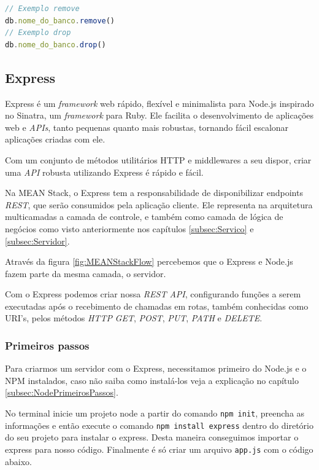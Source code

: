 \documentclass[
	12pt,				%
	openright,			%
	twoside,			%
	a4paper,			%
	english,			%
	brazil				%
	]{abntex2}
\begin{document}
\begin{lstlisting}[language=javascript]
// Exemplo remove
db.nome_do_banco.remove()
// Exemplo drop
db.nome_do_banco.drop()
\end{lstlisting}


\subsection{Express}

Express é um \textit{framework} web rápido, flexível e minimalista para Node.js inspirado no Sinatra, um \textit{framework} para Ruby. Ele facilita o desenvolvimento de aplicações web e \textit{APIs}, tanto pequenas quanto mais robustas, tornando fácil escalonar aplicações criadas com ele.

Com um conjunto de métodos utilitários HTTP e middlewares a seu dispor, criar uma \textit{API} robusta utilizando Express é rápido e fácil.

Na MEAN Stack, o Express tem a responsabilidade de disponibilizar endpoints \textit{REST}, que serão consumidos pela aplicação cliente. Ele representa na arquitetura multicamadas a camada de controle, e também como camada de lógica de negócios como visto anteriormente nos capítulos \ref{subsec:Servico} e \ref{subsec:Servidor}.

Através da figura \ref{fig:MEANStackFlow} percebemos que o Express e Node.js fazem parte da mesma camada, o servidor.

Com o Express podemos criar nossa \textit{REST API}, configurando funções a serem executadas após o recebimento de chamadas em rotas, também conhecidas como URI's, pelos métodos \textit{HTTP} \textit{GET}, \textit{POST}, \textit{PUT}, \textit{PATH} e \textit{DELETE}.

\subsubsection {Primeiros passos}

Para criarmos um servidor com o Express, necessitamos primeiro do Node.js e o NPM instalados, caso não saiba como instalá-los veja a explicação no capítulo \ref{subsec:NodePrimeirosPassos}.

No terminal inicie um projeto node a partir do comando \verb|npm init|, preencha as informações e então execute o comando \verb|npm install express| dentro do diretório do seu projeto para instalar o express. Desta maneira conseguimos importar o express para nosso código. Finalmente é só criar um arquivo \verb|app.js| com o código abaixo.
\end{document}
